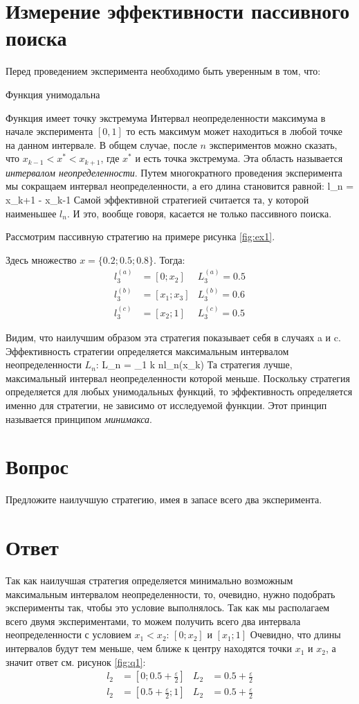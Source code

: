 \section{Измерение эффективности пассивного поиска}
Перед проведением эксперимента необходимо быть уверенным в том, что:
\bi
\item Функция унимодальна
\item Функция имеет точку экстремума
\ei
Интервал неопределенности максимума в начале эксперимента $[0,1]$ то есть максимум может находиться в любой точке на данном интервале. 
В общем случае, после $n$ экспериментов можно сказать, что $x_{k-1} < x^* < x_{k+1}$, где $x^*$ и есть точка экстремума. Эта область называется \textit{интервалом неопределенности}. Путем многократного проведения эксперимента мы сокращаем интервал неопределенности, а его длина становится равной:
\be
l_n = x_{k+1} - x_{k-1}
\ee
Самой эффективной стратегией считается та, у которой наименьшее $l_n$. И это, вообще говоря, касается не только пассивного поиска.

Рассмотрим пассивную стратегию на примере рисунка \ref{fig:ex1}.

Здесь множество $x=\{0.2; 0.5; 0.8\}$. Тогда:
\begin{align*} l^{(a)}_3  & {} = [0;x_2]   & L^{(a)}_3 = 0.5 \\  
               l^{(b)}_3  & {} = [x_1;x_3] & L^{(b)}_3 = 0.6 \\
               l^{(c)}_3  & {} = [x_2;1]   & L^{(c)}_3 = 0.5 \end{align*} 

Видим, что наилучшим образом эта стратегия показывает себя в случаях a и c. Эффективность стратегии определяется максимальным интервалом неопределенности $L_n$:
\be
L_n = \max_{1 \leqslant k \leqslant n}{l_n(x_k)}
\ee
Та стратегия лучше, максимальный интервал неопределенности которой меньше. Поскольку стратегия определяется для любых унимодальных функций, то эффективность определяется именно для стратегии, не зависимо от исследуемой функции. Этот принцип называется принципом \textit{минимакса}.
\section*{Вопрос}
Предложите наилучшую стратегию, имея в запасе всего два эксперимента.
\section*{Ответ}
Так как наилучшая стратегия определяется минимально возможным максимальным интервалом неопределенности, то, очевидно, нужно подобрать эксперименты так, чтобы это условие выполнялось. Так как мы располагаем всего двумя экспериментами, то можем получить всего два интервала неопределенности с условием $x_1<x_2$: $[0; x_2]$ и $[x_1; 1]$
Очевидно, что длины интервалов будут тем меньше, чем ближе к центру находятся точки $x_1$ и $x_2$, а значит ответ см. рисунок \ref{fig:q1}:
\begin{align*}l_2 & {}= [0; 0.5 + \frac{\varepsilon}{2}]  & L_2 & {}= 0.5+ \frac{\varepsilon}{2}\\
              l_2 & {}= [0.5 + \frac{\varepsilon}{2} ; 1] & L_2 & {}= 0.5+ \frac{\varepsilon}{2}\end{align*}

